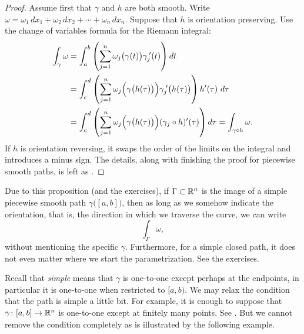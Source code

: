 \begin{proof}
Assume first that $\gamma$ and $h$ are both smooth.
Write $\omega = \omega_1 \, dx_1 + \omega_2 \, dx_2 + \cdots +
\omega_n \, dx_n$.
Suppose that $h$ is orientation preserving.  Use
the change of variables formula for the Riemann integral:
\begin{equation*}
\begin{split}
\int_{\gamma} \omega
& =
\int_a^b 
\left(
\sum_{j=1}^n
\omega_j\bigl(\gamma(t)\bigr) \gamma_j^{\:\prime}(t)
\right) dt
\\
& =
\int_c^d 
\left(
\sum_{j=1}^n
\omega_j\Bigl(\gamma\bigl(h(\tau)\bigr)\Bigr) \gamma_j^{\:\prime}\bigl(h(\tau)\bigr)
\right) h'(\tau) ~ d\tau
\\
& =
\int_c^d 
\left(
\sum_{j=1}^n
\omega_j\Bigl(\gamma\bigl(h(\tau)\bigr)\Bigr) (\gamma_j \circ h)'(\tau)
\right) d\tau
=
\int_{\gamma \circ h} \omega .
\end{split}
\end{equation*}
If $h$ is orientation reversing, it swaps the order of the limits on the
integral and introduces a minus sign.
The details, along with finishing the proof for piecewise smooth
paths, is left as .
\end{proof}

Due to this proposition (and the exercises), if $\Gamma
\subset {\mathbb{R}}^n$ is the image of a simple piecewise smooth path
$\gamma\bigl([a,b]\bigr)$, then as long as we somehow indicate the orientation, that
is, the direction in which we traverse the curve, we can write
\begin{equation*}
\int_{\Gamma} \omega ,
\end{equation*}
without mentioning the specific $\gamma$.
Furthermore, for a simple closed path, it does not even matter where we
start the parametrization.  See the exercises.

Recall that \emph{simple} means that $\gamma$
is one-to-one except perhaps at the endpoints, in particular
it is one-to-one when restricted to $[a,b)$.
We may relax the condition that the path is simple a little bit.
For example, it is enough to suppose that
$\gamma \colon [a,b] \to {\mathbb{R}}^n$ is one-to-one except at finitely many points.
See .  But we cannot remove
the condition completely as is
illustrated by the following example.


